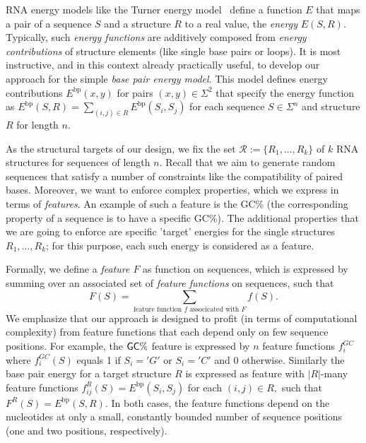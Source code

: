 \documentclass{bmcart}
\newcommand{\R}{\mathcal{R}}
\newcommand{\EbpSym}{E^{\textrm{bp}}}
\newcommand{\Def}[1]{\emph{#1}}
\newcommand{\Nuc}[1]{{\sf #1}}
\newcommand{\Cb}{\Nuc{C}}
\newcommand{\Gb}{\Nuc{G}}
\newcommand{\GCb}{\Gb\Cb}
\newcommand{\citep}[1]{\cite{#1}}
\begin{document}
RNA energy models like the Turner energy model~\citep{Turner2009} define a function $E$ that maps a pair of a sequence $S$ and a structure $R$ to a real value, the \Def{energy} $E(S,R)$. 
Typically, such \Def{energy functions} are additively composed from \Def{energy contributions} of structure elements (like single base pairs or loops). It is most instructive, and in this context already practically useful, to develop our approach for the simple \Def{base pair energy model}. This model defines energy contributions $\EbpSym(x,y)$ for pairs $(x,y)\in\Sigma^2$ that specify the energy function as
$
\EbpSym(S,R) = \sum_{(i,j)\in R} \EbpSym(S_i,S_j)
$
for each sequence $S\in\Sigma^n$ and structure $R$ for length $n$.

As the structural targets of our design, we fix the set $\R:=\{R_1, \dots, R_k\}$ of $k$ RNA structures for sequences of length $n$.
Recall that we aim to generate random sequences that satisfy a number of constraints like the compatibility of paired bases. Moreover, we want to enforce complex properties, which we express in terms of \emph{features}. An example of such a feature is the \GCb\% (the corresponding property of a sequence is to have a specific \GCb\%). The additional properties that we are going to enforce are specific 'target' energies for the single structures $R_1, \dots, R_k$; for this purpose, each such energy is considered as a feature.

Formally, we define a \Def{feature $F$} as function on sequences, which is expressed by summing over an associated set of \Def{feature functions} on sequences, such that
$$
F(S) = \sum_{\text{feature function $f$ associcated with $F$}} f(S).
$$
We emphasize that our approach is designed to profit (in terms of computational complexity) from feature functions that each depend only on few sequence positions. For example, the $\GCb\%$ feature is expressed by $n$ feature functions $f^{GC}_i$ where $f^{GC}_i(S)$ equals 1 if $S_i='G'$ or $S_i='C'$ and 0 otherwise. Similarly the base pair energy for a target structure $R$ is expressed as feature with $|R|$-many feature functions $f^R_{ij}(S)=\EbpSym(S_i,S_j)$ for each $(i,j)\in R,$ such that $F^R(S)=\EbpSym(S,R)$. In both cases, the feature functions depend on the nucleotides at only a small, constantly bounded number of sequence positions (one and two positions, respectively).
 
\end{document}

